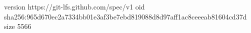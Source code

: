 version https://git-lfs.github.com/spec/v1
oid sha256:965d670ec2a7334bb01e3af3be7ebd819088d8d97aff1ac8ceeeab81604cd37d
size 5566

